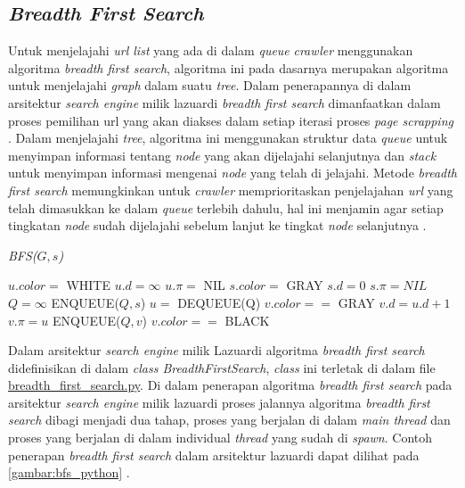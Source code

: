 \subsection{\emph{Breadth First Search}}

Untuk menjelajahi \emph{url list} yang ada di dalam \emph{queue} \emph{crawler} menggunakan algoritma \emph{breadth first search}, algoritma ini pada dasarnya merupakan algoritma untuk menjelajahi \emph{graph} dalam suatu \emph{tree}. Dalam penerapannya di dalam arsitektur \emph{search engine} milik lazuardi \emph{breadth first search} dimanfaatkan dalam proses pemilihan url yang akan diakses dalam setiap iterasi proses \emph{page scrapping} \citep{lazuardithesis}. Dalam menjelajahi \emph{tree}, algoritma ini menggunakan struktur data \emph{queue} untuk menyimpan informasi tentang \emph{node} yang akan dijelajahi selanjutnya dan \emph{stack} untuk menyimpan informasi mengenai \emph{node} yang telah di jelajahi. Metode \emph{breadth first search} memungkinkan untuk \emph{crawler} memprioritaskan penjelajahan \emph{url} yang telah dimasukkan ke dalam \emph{queue} terlebih dahulu, hal ini menjamin agar setiap tingkatan \emph{node} sudah dijelajahi sebelum lanjut ke tingkat \emph{node} selanjutnya \citep{cormen2009introduction}.

\begin{algorithm}[H]
	\caption{\emph{BFS($G,s$)} \citep{cormen2009introduction}}
	\label{algoritma_bfs}
	\begin{algorithmic}[1]
		\State $ u.color =$ WHITE
		\State $ u.d = \infty$
		\State $ u.\pi =$ NIL
		\EndFor
		\State $ s.color = $ GRAY
		\State $s.d = 0$
		\State $s.\pi = NIL$
		\State $Q = \infty$
		\State ENQUEUE($Q,s$)
		\State $u =$ DEQUEUE(Q)
		\State $v.color ==$ GRAY
		\State $v.d = u.d +1$
		\State $v.\pi = u$
		\State ENQUEUE($Q, v$)
		\State $v.color ==$ BLACK
		\EndIf
		\EndFor
		\EndWhile
	\end{algorithmic}
\end{algorithm}

Dalam arsitektur \emph{search engine} milik Lazuardi algoritma \emph{breadth first search} didefinisikan di dalam \emph{class BreadthFirstSearch}, \emph{class} ini terletak di dalam file \url{breadth_first_search.py}. Di dalam penerapan algoritma \emph{breadth first search} pada arsitektur \emph{search engine} milik lazuardi proses jalannya algoritma \emph{breadth first search} dibagi menjadi dua tahap, proses yang berjalan di dalam \emph{main thread} dan proses yang berjalan di dalam individual \emph{thread} yang sudah di \emph{spawn}. Contoh penerapan \emph{breadth first search} dalam arsitektur lazuardi dapat dilihat pada \ref{gambar:bfs_python} \citep{lazuardithesis}.

